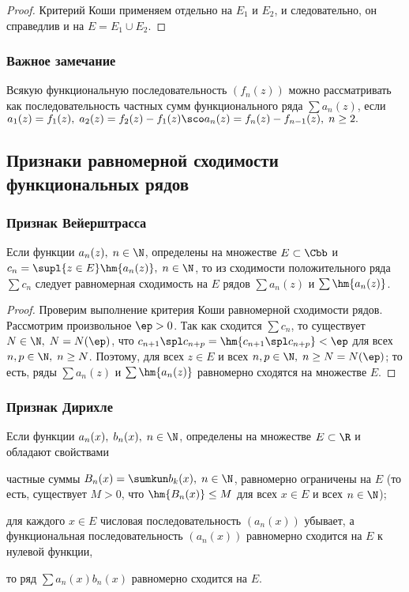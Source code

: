\documentclass[a4paper]{article}
\begin{document}
\begin{proof}
Критерий Коши применяем отдельно на $E_1$ и $E_2$, и следовательно,
он справедлив и на $E=E_1\cup E_2$.
\end{proof}

\subsubsection{Важное замечание}
Всякую функциональную последовательность $(f_n(z))$ можно
рассматривать как последовательность частных сумм функционального
ряда $\sum a_n(z)$, если $a_1(z)=f_1(z), \; a_2(z) = f_2(z)-f_1(z)
\sco a_n(z)=f_n(z)-f_{n-1}(z), \; n\ge2.$

\subsection{Признаки равномерной сходимости функциональных рядов}

\subsubsection{Признак Вейерштрасса}
\begin{theorem}
Если функции $a_n(z), \; n\in\N$, определены на множестве
$E\subset\Cbb$ и $c_n = \supl{z\in E} \hm{a_n(z)}, \; n\in\N$, то из
сходимости положительного ряда $\sum c_n$ следует равномерная
сходимость на $E$ рядов $\sum a_n(z)$ и $\sum \hm{a_n(z)}$.
\end{theorem}

\begin{proof}
Проверим выполнение критерия Коши равномерной сходимости рядов.
Рассмотрим произвольное $\ep>0$. Так как сходится $\sum c_n$, то
существует $N\in\N, \; N=N(\ep)$, что $c_{n+1} \spl c_{n+p} =
\hm{c_{n+1} \spl c_{n+p}} < \ep$ для всех $n,p\in\N, \; n\ge N$.
Поэтому,  для всех $z\in
E$ и всех $n,p\in\N, \; n\ge N=N(\ep)$; то есть, ряды $\sum a_n(z)$
и $\sum \hm{a_n(z)}$ равномерно сходятся на множестве $E$.
\end{proof}

\subsubsection{Признак Дирихле}

\begin{theorem}
Если функции $a_n(x), \; b_n(x), \; n\in\N$, определены на множестве
$E\subset\R$ и обладают свойствами \begin{points}{-2} \item частные
суммы $B_n(x)=\sumkun b_k(x), \; n\in\N$, равномерно ограничены на
$E$ (то есть, существует $M>0$, что $\hm{B_n(x)}\le M$ для всех
$x\in E$ и всех $n\in\N$); \item для каждого $x\in E$ числовая
последовательность $(a_n(x))$ убывает, а функциональная
последовательность $(a_n(x))$ равномерно сходится на $E$ к нулевой
функции,\end{points} то ряд $\sum a_n(x)b_n(x)$ равномерно сходится
на $E$.
\end{theorem}
\end{document}
